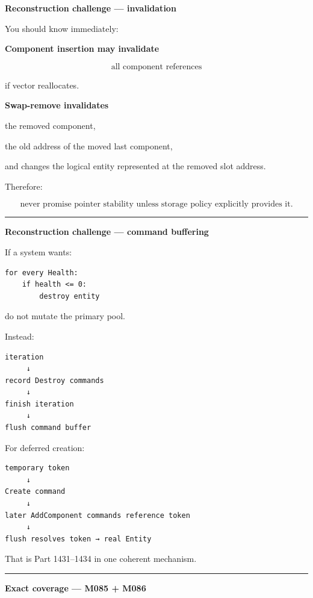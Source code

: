 \textbf{Reconstruction challenge --- invalidation}

You should know immediately:

\textbf{Component insertion may invalidate}

\[
\text{all component references}
\]

if vector reallocates.

\textbf{Swap-remove invalidates}

the removed component,

the old address of the moved last component,

and changes the logical entity represented at the removed slot address.

Therefore:

\[
\boxed{
\text{never promise pointer stability unless storage policy explicitly provides it}.
}
\]

\begin{center}\rule{0.5\linewidth}{0.5pt}\end{center}

\textbf{Reconstruction challenge --- command buffering}

If a system wants:

\begin{verbatim}
for every Health:
    if health <= 0:
        destroy entity
\end{verbatim}

do not mutate the primary pool.

Instead:

\begin{verbatim}
iteration
     ↓
record Destroy commands
     ↓
finish iteration
     ↓
flush command buffer
\end{verbatim}

For deferred creation:

\begin{verbatim}
temporary token
     ↓
Create command
     ↓
later AddComponent commands reference token
     ↓
flush resolves token → real Entity
\end{verbatim}

That is Part 1431--1434 in one coherent mechanism.

\begin{center}\rule{0.5\linewidth}{0.5pt}\end{center}

\textbf{Exact coverage --- M085 + M086}

